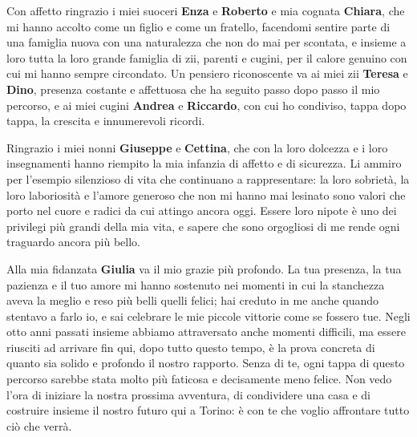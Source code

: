 Con affetto ringrazio i miei suoceri \textbf{Enza} e \textbf{Roberto} e mia cognata \textbf{Chiara}, che mi hanno accolto come un figlio e come un fratello, facendomi sentire parte di una famiglia nuova con una naturalezza che non do mai per scontata, e insieme a loro tutta la loro grande famiglia di zii, parenti e cugini, per il calore genuino con cui mi hanno sempre circondato. Un pensiero riconoscente va ai miei zii \textbf{Teresa} e \textbf{Dino}, presenza costante e affettuosa che ha seguito passo dopo passo il mio percorso, e ai miei cugini \textbf{Andrea} e \textbf{Riccardo}, con cui ho condiviso, tappa dopo tappa, la crescita e innumerevoli ricordi.

Ringrazio i miei nonni \textbf{Giuseppe} e \textbf{Cettina}, che con la loro dolcezza e i loro insegnamenti hanno riempito la mia infanzia di affetto e di sicurezza. Li ammiro per l'esempio silenzioso di vita che continuano a rappresentare: la loro sobrietà, la loro laboriosità e l'amore generoso che non mi hanno mai lesinato sono valori che porto nel cuore e radici da cui attingo ancora oggi. Essere loro nipote è uno dei privilegi più grandi della mia vita, e sapere che sono orgogliosi di me rende ogni traguardo ancora più bello.

Alla mia fidanzata \textbf{Giulia} va il mio grazie più profondo. La tua presenza, la tua pazienza e il tuo amore mi hanno sostenuto nei momenti in cui la stanchezza aveva la meglio e reso più belli quelli felici; hai creduto in me anche quando stentavo a farlo io, e sai celebrare le mie piccole vittorie come se fossero tue. Negli otto anni passati insieme abbiamo attraversato anche momenti difficili, ma essere riusciti ad arrivare fin qui, dopo tutto questo tempo, è la prova concreta di quanto sia solido e profondo il nostro rapporto. Senza di te, ogni tappa di questo percorso sarebbe stata molto più faticosa e decisamente meno felice. Non vedo l'ora di iniziare la nostra prossima avventura, di condividere una casa e di costruire insieme il nostro futuro qui a Torino: è con te che voglio affrontare tutto ciò che verrà.

